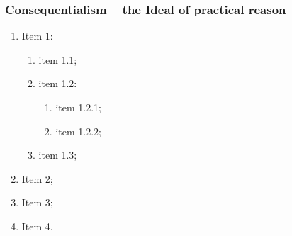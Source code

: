 \subsubsection{Consequentialism -- the Ideal of practical reason}
\kant[3]
\begin{enumerate}
    \item Item 1:
          \begin{enumerate}
              \item item 1.1;
              \item item 1.2:
                    \begin{enumerate}
                        \item item 1.2.1;
                        \item item 1.2.2;
                    \end{enumerate}
              \item item 1.3;
          \end{enumerate}
    \item Item 2;
    \item Item 3;
    \item Item 4.
\end{enumerate}

\kant[9]

